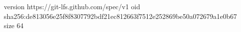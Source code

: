 version https://git-lfs.github.com/spec/v1
oid sha256:de813056e25f8f8307792bdf21ec812663f7512e252869be50a072679a1e0b67
size 64
